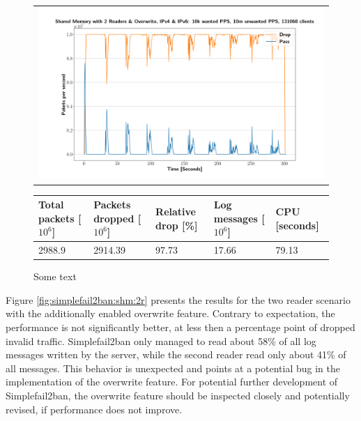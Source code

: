 \begin{figure}[!h]
	\centering
	\scriptsize
	\begin{tabular}{c}
    	\centerline{\includegraphics[width=1.2\textwidth]{images/simplefail2ban_shm_2r_or_ipv46_v10k_iv10m_c131068.png}}
	\end{tabular}
	\begin{tabular}{lllll}
		\toprule
		\textbf{Total packets [$10^6$]} & \textbf{Packets dropped [$10^6$]} & \textbf{Relative drop [\%]} & \textbf{Log messages [$10^6$]} & \textbf{CPU [seconds]} \\ \midrule 
		2988.9 & 2914.39 & 97.73 & 17.66 & 79.13 \\
		\bottomrule
	\end{tabular}
	\caption[Simplefail2ban, Shared Memory 2 Readers with Overwrite]{Some text}
	\label{fig:simplefail2ban:shm:or}
\end{figure}

Figure \ref{fig:simplefail2ban:shm:2r} presents the results for the two reader scenario with the additionally enabled overwrite feature. Contrary to expectation,
the performance is not significantly better, at less then a percentage point of dropped invalid traffic. Simplefail2ban only managed to read about 58\% of all log messages 
written by the server, while the second reader read only about 41\% of all messages. This behavior is unexpected and points at a potential bug in the implementation of the overwrite
feature. For potential further development of Simplefail2ban, the overwrite feature should be inspected closely and potentially revised, if performance does not improve. 

